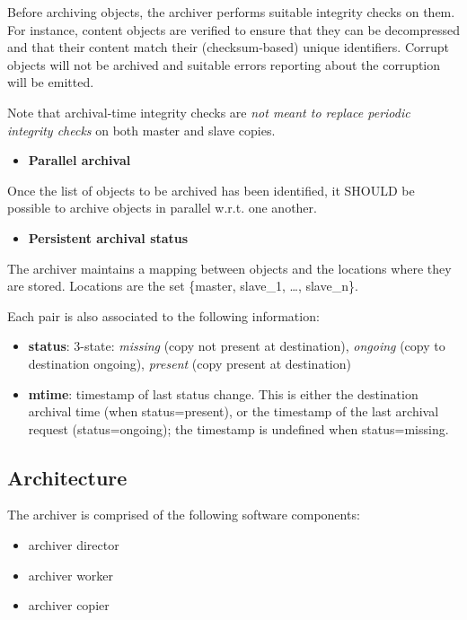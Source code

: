 Before archiving objects, the archiver performs suitable integrity
checks on them. For instance, content objects are verified to ensure
that they can be decompressed and that their content match their
(checksum-based) unique identifiers. Corrupt objects will not be
archived and suitable errors reporting about the corruption will be
emitted.

Note that archival-time integrity checks are \emph{not meant to replace
periodic integrity checks} on both master and slave copies.

\begin{itemize}
\itemsep1pt\parskip0pt
\item
  \textbf{Parallel archival}
\end{itemize}

Once the list of objects to be archived has been identified, it SHOULD
be possible to archive objects in parallel w.r.t. one another.

\begin{itemize}
\itemsep1pt\parskip0pt
\item
  \textbf{Persistent archival status}
\end{itemize}

The archiver maintains a mapping between objects and the locations where
they are stored. Locations are the set \{master, slave\_1, \ldots{},
slave\_n\}.

Each pair is also associated to the following information:

\begin{itemize}
\itemsep1pt\parskip0pt
\item
  \textbf{status}: 3-state: \emph{missing} (copy not present at
  destination), \emph{ongoing} (copy to destination ongoing),
  \emph{present} (copy present at destination)
\item
  \textbf{mtime}: timestamp of last status change. This is either the
  destination archival time (when status=present), or the timestamp of
  the last archival request (status=ongoing); the timestamp is undefined
  when status=missing.
\end{itemize}

\subsection{Architecture}\label{architecture}

The archiver is comprised of the following software components:

\begin{itemize}
\itemsep1pt\parskip0pt
\item
  archiver director
\item
  archiver worker
\item
  archiver copier
\end{itemize}


